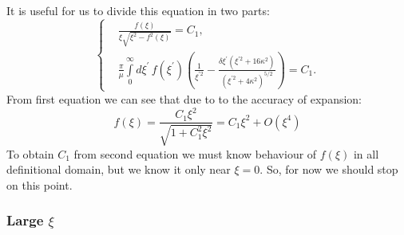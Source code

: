 \documentclass[10pt]{article}
\begin{document}
It is useful for us to divide this equation in two parts:
\begin{equation}
  \left\{
    \begin{aligned}
      &\frac{f(\xi)}{\xi \sqrt{\xi^{2} - f^2 (\xi)}} = C_1,\\
      &\frac{\pi}{\mu} \int\limits_0^\infty d \xi^{\prime} \, f(\xi^{\prime}) \left( \frac{1}{\xi^{\prime 2}} - \frac{\delta \xi^{\prime} ( \xi^{\prime 2} + 16 \kappa^2 )}{(\xi^{\prime 2} + 4 \kappa^2)^{5/2}} \right) = C_1.
    \end{aligned}
  \right.
  \label{asmpt_0}
\end{equation}
From first equation we can see that due to to the accuracy of expansion:
\begin{equation}
  f(\xi) = \frac{C_1 \xi^2}{\sqrt{1+C_1^2 \xi^2}} = C_1 \xi^2 + O(\xi^4)
\end{equation}
To obtain $C_1$ from second equation we must know behaviour of $f(\xi)$ in all definitional domain, but we know it only near $\xi = 0.$
So, for now we should stop on this point.



\subsubsection{Large $\xi$}
\end{document}
